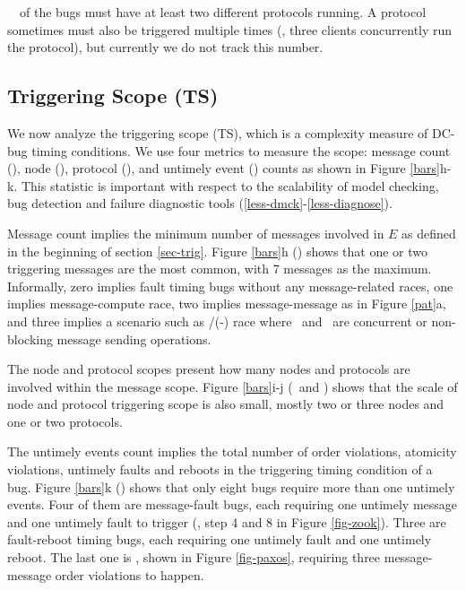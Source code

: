 






\pctProtMany\ \xxx\ of the bugs must
have at least two different protocols running.  A protocol sometimes
must also be triggered multiple times (\eg, three clients concurrently
run the  protocol), but currently we do not track this
number.  
\fi


\vten


\subsection{Triggering Scope (TS)}
\label{trig-scope}


We now analyze the triggering scope (TS), which is a complexity measure of
DC-bug timing conditions.  We use four metrics to measure the scope:
message count (\BTSM), node (\BTSN), protocol (\BTSP), and untimely
event (\BTSU) counts as shown in Figure \ref{bars}h-k.  This statistic
is important with respect to the scalability of model checking, bug
detection and failure diagnostic tools
(\sec\ref{less-dmck}-\ref{less-diagnose}).

Message count implies the minimum
number of messages involved in $E$ as defined in the beginning of
section \ref{sec-trig}.  Figure \ref{bars}h (\BTSM) shows that one or two
triggering messages are the most common, with 7 messages as the
maximum.  Informally, zero implies fault timing bugs without any
message-related races, one implies message-compute race, two implies
message-message as in Figure \ref{pat}a, and three implies a scenario
such as \mac/(\mab-\mbc) race where \mab\ and \mac\ are concurrent or
non-blocking message sending operations.

The node and protocol scopes present how many nodes and protocols are
involved within the message scope.  Figure \ref{bars}i-j (\BTSN\ and
\BTSP) shows that the scale of node and protocol triggering scope is
also small, mostly two or three nodes and one or two protocols.

The untimely events count implies the total number of order
violations, atomicity violations, untimely faults and reboots in the
triggering timing condition of a bug.  Figure \ref{bars}k
(\BTSU) shows that only eight bugs require more than one untimely
events.  Four of them are message-fault bugs, each 
requiring one untimely message and one
untimely fault to trigger (\eg, step 4 and 8 in 
Figure \ref{fig-zook}).  Three are fault-reboot timing bugs,
each requiring one untimely fault and one untimely reboot.
The last one is , shown in Figure \ref{fig-paxos}, requiring
three message-message order violations to happen.

